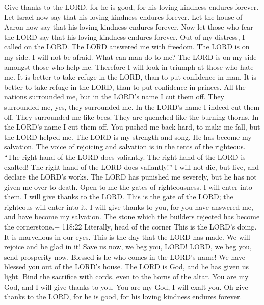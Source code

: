  Give thanks to the LORD, for he is good, for his loving
kindness endures forever.  Let Israel now say that his
loving kindness endures forever.  Let the house of Aaron now
say that his loving kindness endures forever.  Now let those
who fear the LORD say that his loving kindness endures forever.
 Out of my distress, I called on the LORD. The LORD answered
me with freedom.  The LORD is on my side. I will not be
afraid. What can man do to me?  The LORD is on my side
amongst those who help me. Therefore I will look in triumph at those who
hate me.  It is better to take refuge in the LORD, than to
put confidence in man.  It is better to take refuge in the
LORD, than to put confidence in princes.  All the nations
surrounded me, but in the LORD's name I cut them off.  They
surrounded me, yes, they surrounded me. In the LORD's name I indeed cut
them off.  They surrounded me like bees. They are quenched
like the burning thorns. In the LORD's name I cut them off.
 You pushed me back hard, to make me fall, but the LORD
helped me.  The LORD is my strength and song. He has become
my salvation.  The voice of rejoicing and salvation is in
the tents of the righteous. ``The right hand of the LORD does valiantly.
 The right hand of the LORD is exalted! The right hand of
the LORD does valiantly!''  I will not die, but live, and
declare the LORD's works.  The LORD has punished me
severely, but he has not given me over to death.  Open to
me the gates of righteousness. I will enter into them. I will give
thanks to the LORD.  This is the gate of the LORD; the
righteous will enter into it.  I will give thanks to you,
for you have answered me, and have become my salvation. 
The stone which the builders rejected has become the cornerstone.+
118:22 Literally, head of the corner  This is the LORD's
doing. It is marvellous in our eyes.  This is the day that
the LORD has made. We will rejoice and be glad in it!  Save
us now, we beg you, LORD! LORD, we beg you, send prosperity now.
 Blessed is he who comes in the LORD's name! We have
blessed you out of the LORD's house.  The LORD is God, and
he has given us light. Bind the sacrifice with cords, even to the horns
of the altar.  You are my God, and I will give thanks to
you. You are my God, I will exalt you.  Oh give thanks to
the LORD, for he is good, for his loving kindness endures forever.

